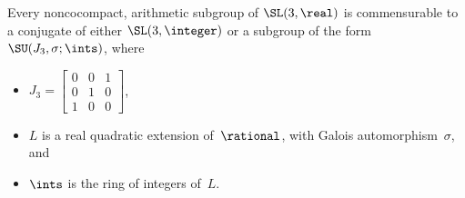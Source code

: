\begin{prop} \label{AllNoncocptSL3R}
Every noncocompact, arithmetic subgroup of\/ $\SL(3,\real)$ is commensurable to a conjugate of either\/
 $\SL(3,\integer)$ or a subgroup of the form\/ $\SU(J_3, \sigma; \ints)$, where
 	\begin{itemize}
	\item $J_3 = 
		 \begin{bmatrix}
		 0 & 0 & 1 \\
		 0 & 1 & 0 \\
		 1 & 0 & 0
		 \end{bmatrix}$,
 	\item $L$ is a real quadratic extension of\/~$\rational$, with Galois automorphism~$\sigma$,
	and
	\item $\ints$ is the ring of integers of~$L$.
	\end{itemize}
 \end{prop}

